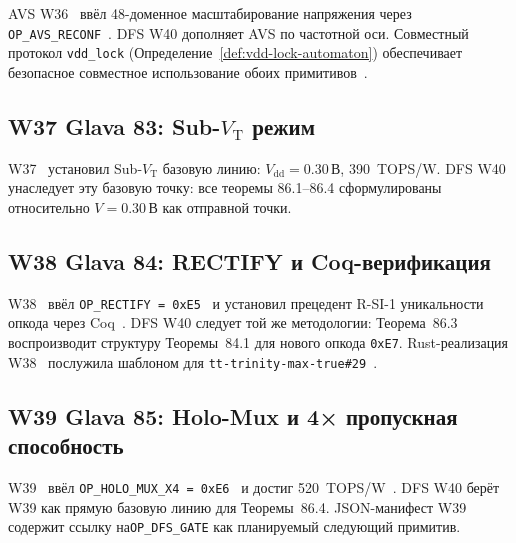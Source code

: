 AVS W36~\cite{trios877} ввёл 48-доменное масштабирование напряжения
через \texttt{OP\_AVS\_RECONF}~\cite{t27655}.
DFS W40 дополняет AVS по частотной оси.
Совместный протокол \texttt{vdd\_lock} (Определение~\ref{def:vdd-lock-automaton})
обеспечивает безопасное совместное использование обоих примитивов~\cite{trinity-fpga134}.

\subsection{W37 Glava 83: Sub-$V_{\mathrm{T}}$ режим}
\label{subsec:glava83}

W37~\cite{t27660} установил Sub-$V_{\mathrm{T}}$ базовую линию:
$V_{\mathrm{dd}} = 0{.}30\,\text{В}$, 390~TOPS/W.
DFS W40 унаследует эту базовую точку: все теоремы 86.1--86.4
сформулированы относительно $V = 0{.}30\,\text{В}$ как отправной точки.

\subsection{W38 Glava 84: RECTIFY и Coq-верификация}
\label{subsec:glava84}

W38~\cite{trios884} ввёл \texttt{OP\_RECTIFY = 0xE5}~\cite{trinity-fpga137}
и установил прецедент R-SI-1 уникальности опкода через Coq~\cite{t27661}.
DFS W40 следует той же методологии: Теорема~86.3 воспроизводит структуру
Теоремы~84.1 для нового опкода \texttt{0xE7}.
Rust-реализация W38~\cite{tt-trinity-max-true27} послужила шаблоном
для \texttt{tt-trinity-max-true\#29}~\cite{tt-trinity-max-true29}.

\subsection{W39 Glava 85: Holo-Mux и 4× пропускная способность}
\label{subsec:glava85}

W39~\cite{trios891} ввёл \texttt{OP\_HOLO\_MUX\_X4 = 0xE6}~\cite{t27665}
и достиг 520~TOPS/W~\cite{trinity-fpga140}.
DFS W40 берёт W39 как прямую базовую линию для Теоремы~86.4.
JSON-манифест W39~\cite{trios886} содержит ссылку на\texttt{OP\_DFS\_GATE}
как планируемый следующий примитив.


